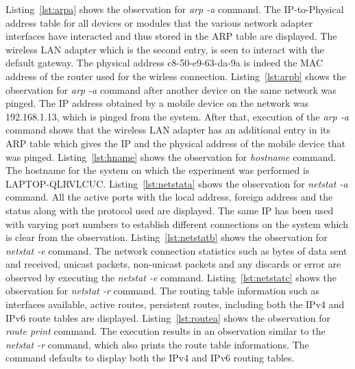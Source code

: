 \documentclass{lab_sheet}
\begin{document}
    Listing~\ref{lst:arpa} shows the observation for \textit{arp -a} command. The IP-to-Physical address table for all devices or modules that the various network adapter interfaces have interacted and thus stored in the ARP table are displayed. The wireless LAN adapter which is the second entry, is seen to interact with the default gateway. The physical address c8-50-e9-63-da-9a is indeed the MAC address of the router used for the wirless connection. 
    Listing~\ref{lst:arpb} shows the observation for \textit{arp -a} command after another device on the same network was pinged. The IP address obtained by a mobile device on the network was 192.168.1.13, which is pinged from the system. After that, execution of the \textit{arp -a} command shows that the wireless LAN adapter has an additional entry in its ARP table which gives the IP and the physical address of the mobile device that was pinged.
    Listing~\ref{lst:hname} shows the observation for \textit{hostname} command. The hostname for the system on which the experiment was performed is LAPTOP-QLRVLCUC.
    Listing~\ref{lst:netstata} shows the observation for \textit{netstat -a} command. All the active ports with the local address, foreign address and the status along with the protocol used are displayed. The same IP has been used with varying port numbers to establish different connections on the system which is clear from the observation.
    Listing~\ref{lst:netstatb} shows the observation for \textit{netstat -e} command. The network connection statistics such as bytes of data sent and received, unicast packets, non-unicast packets and any discards or error are observed by executing the \textit{netstat -e} command.
    Listing~\ref{lst:netstatc} shows the observation for \textit{netstat -r} command. The routing table information such as interfaces available, active routes, persistent routes, including both the IPv4 and IPv6 route tables are displayed.
    Listing~\ref{lst:routea} shows the observation for \textit{route print} command. The execution results in an observation similar to the \textit{netstat -r} command, which also prints the route table informations. The command defaults to display both the IPv4 and IPv6 routing tables.
\end{document}
